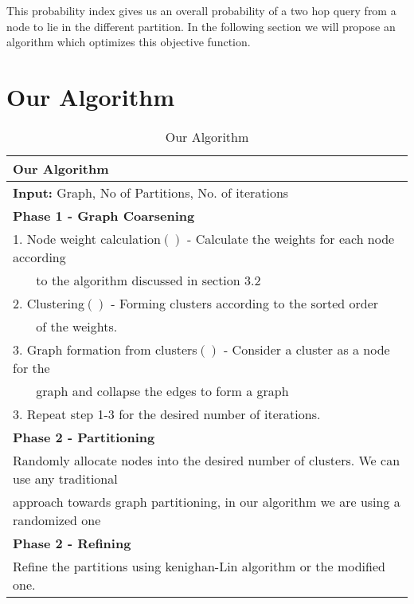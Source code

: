 \documentclass[letterpaper]{article}
\begin{document}
        This probability index gives us an overall probability of a two hop query from a node to lie in the
 different partition. In the following section we will propose an algorithm which optimizes this objective 
function.

\section{Our Algorithm}
\begin{table*}[htb]
\centering
\begin{tabular}{|l|}%
\hline
\textbf{Our Algorithm}\\
\hline
\textbf{Input: }Graph, No of Partitions, No. of iterations\\
\hline
\textbf{Phase 1 - Graph Coarsening }\\
1. Node weight calculation$()$ - Calculate the weights for each node according \\
~~~ to the algorithm discussed in section 3.2\\
2. Clustering$()$ - Forming clusters according to the sorted order\\
~~~ of the weights.\\
3. Graph formation from clusters$()$ - Consider a cluster as a node for the\\
~~~ graph and collapse the edges to form a graph\\
3. Repeat step 1-3 for the desired number of iterations.\\
\textbf{Phase 2 - Partitioning}\\
 Randomly allocate nodes into the desired number of clusters. We can use any traditional\\
 approach towards graph partitioning, in our algorithm  we are using a randomized one\\

\textbf{Phase 2 - Refining}\\
 Refine the partitions using kenighan-Lin algorithm or the modified one.\\
\hline
\end{tabular}
\caption{Our Algorithm}
\label{alg}
\end{table*}
\end{document}

